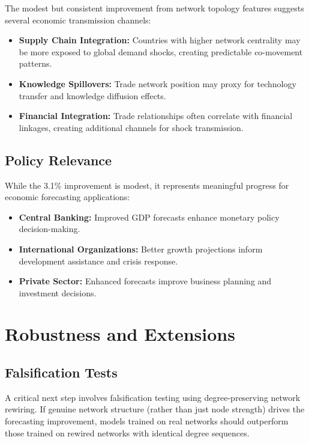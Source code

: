 \documentclass[11pt,a4paper]{article}
\begin{document}
The modest but consistent improvement from network topology features suggests several economic transmission channels:

\begin{itemize}
\item \textbf{Supply Chain Integration:} Countries with higher network centrality may be more exposed to global demand shocks, creating predictable co-movement patterns.
\item \textbf{Knowledge Spillovers:} Trade network position may proxy for technology transfer and knowledge diffusion effects.
\item \textbf{Financial Integration:} Trade relationships often correlate with financial linkages, creating additional channels for shock transmission.
\end{itemize}

\subsection{Policy Relevance}

While the 3.1\% improvement is modest, it represents meaningful progress for economic forecasting applications:

\begin{itemize}
\item \textbf{Central Banking:} Improved GDP forecasts enhance monetary policy decision-making.
\item \textbf{International Organizations:} Better growth projections inform development assistance and crisis response.
\item \textbf{Private Sector:} Enhanced forecasts improve business planning and investment decisions.
\end{itemize}

\section{Robustness and Extensions}

\subsection{Falsification Tests}

A critical next step involves falsification testing using degree-preserving network rewiring. If genuine network structure (rather than just node strength) drives the forecasting improvement, models trained on real networks should outperform those trained on rewired networks with identical degree sequences.
\end{document}
